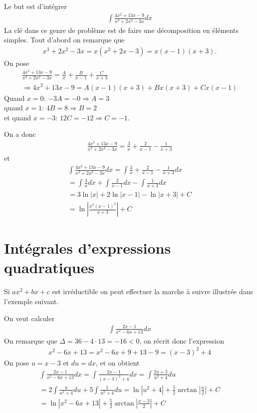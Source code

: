 \begin{myExample}
	Le but est d'intégrer
	\begin{eqnarray*}
		\int\frac{4x^2+13x-9}{x^3+2x^2-3x}dx
	\end{eqnarray*}
	La clé dans ce genre de problème est de faire une décomposition en éléments simples. Tout d'abord on remarque que
	\begin{eqnarray*}
		x^3+2x^2-3x=x(x^2+2x-3)=x(x-1)(x+3).
	\end{eqnarray*}
	On pose
	\begin{eqnarray*}
		\frac{4x^2+13x-9}{x^3+2x^2-3x}=\frac{A}{x}+\frac{B}{x-1}+\frac{C}{x+3}
		\\
		\Rightarrow 4x^2+13x-9=A(x-1)(x+3)+Bx(x+3)+Cx(x-1)
	\end{eqnarray*}
	Quand $x=0$: $-3A=-0\Rightarrow A=3$\\
	quand $x=1$: $4B=8\Rightarrow B=2$\\
	et quand $x=-3$: $12C=-12\Rightarrow C=-1$.
	
	On a donc
	\begin{eqnarray*}
		\frac{4x^2+13x-9}{x^3+2x^2-3x}=\frac{3}{x}+\frac{2}{x-1}-\frac{1}{x+3}
	\end{eqnarray*}
	et
	\begin{eqnarray*}
		\int\frac{4x^2+13x-9}{x^3+2x^2-3x}dx=\int\frac{3}{x}+\frac{2}{x-1}-\frac{1}{x+3}dx
		\\
		=\int\frac{3}{x}dx+\int\frac{2}{x-1}dx-\int\frac{1}{x+3}dx\\
		=3\ln{|x|}+2\ln{|x-1|}-\ln{|x+3|}+C\\
		=\ln{\left|\frac{x^3(x-1)^2}{x+3}\right|}+C
	\end{eqnarray*}
\end{myExample}

\section{Intégrales d'expressions quadratiques}
Si $ax^2+bx+c$ est irréductible on peut effectuer la marche à suivre illustrée dans l'exemple suivant.
\begin{myExample}
	On veut calculer
	\begin{eqnarray*}
		\int\frac{2x-1}{x^2-6x+13}dx
	\end{eqnarray*}
	On remarque que $\Delta=36-4\cdot13=-16<0$, on récrit donc l'expression
	\begin{eqnarray*}
		x^2-6x+13=x^2-6x+9+13-9=(x-3)^2+4
	\end{eqnarray*}
	On pose $u=x-3$ et $du=dx$, et on obtient
	\begin{eqnarray*}
		\int\frac{2x-1}{x^2-6x+13}dx=\int\frac{2x-1}{(x-3)^2+4}dx=\int\frac{2u+5}{u^2+4}du
		\\=2\int\frac{u}{u^2+4}du+5\int\frac{1}{u^2+4}du=\ln{\left|u^2+4\right|}+\frac{5}{2}\arctan{\left|\frac{u}{2}\right|}+C
		\\
		=\ln{\left|x^2-6x+13\right|}+\frac{5}{2}\arctan{\left|\frac{x-3}{2}\right|}+C
	\end{eqnarray*}
\end{myExample}
